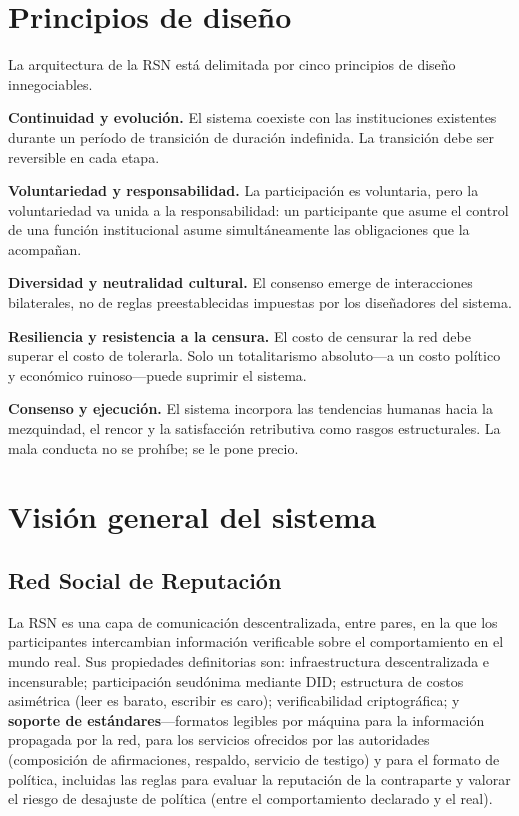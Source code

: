 \documentclass[11pt,a4paper,twocolumn]{article}
\begin{document}
\section{Principios de diseño}

La arquitectura de la RSN está delimitada por cinco principios de diseño innegociables.

\textbf{Continuidad y evolución.} El sistema coexiste con las instituciones existentes durante un período de transición de duración indefinida. La transición debe ser reversible en cada etapa.

\textbf{Voluntariedad y responsabilidad.} La participación es voluntaria, pero la voluntariedad va unida a la responsabilidad: un participante que asume el control de una función institucional asume simultáneamente las obligaciones que la acompañan.

\textbf{Diversidad y neutralidad cultural.} El consenso emerge de interacciones bilaterales, no de reglas preestablecidas impuestas por los diseñadores del sistema.

\textbf{Resiliencia y resistencia a la censura.} El costo de censurar la red debe superar el costo de tolerarla. Solo un totalitarismo absoluto---a un costo político y económico ruinoso---puede suprimir el sistema.

\textbf{Consenso y ejecución.} El sistema incorpora las tendencias humanas hacia la mezquindad, el rencor y la satisfacción retributiva como rasgos estructurales. La mala conducta no se prohíbe; se le pone precio.

\section{Visión general del sistema}

\subsection{Red Social de Reputación}

La RSN es una capa de comunicación descentralizada, entre pares, en la que los participantes intercambian información verificable sobre el comportamiento en el mundo real. Sus propiedades definitorias son: infraestructura descentralizada e incensurable; participación seudónima mediante DID; estructura de costos asimétrica (leer es barato, escribir es caro); verificabilidad criptográfica; y \textbf{soporte de estándares}---formatos legibles por máquina para la información propagada por la red, para los servicios ofrecidos por las autoridades (composición de afirmaciones, respaldo, servicio de testigo) y para el formato de política, incluidas las reglas para evaluar la reputación de la contraparte y valorar el riesgo de desajuste de política (entre el comportamiento declarado y el real).
\end{document}
